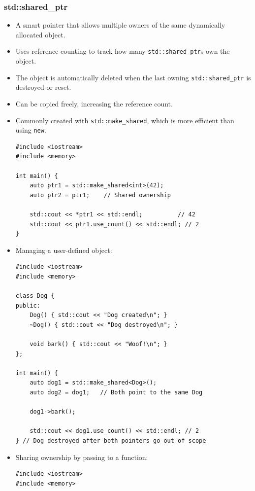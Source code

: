 \documentclass[10pt]{article}
\begin{document}
\newpage
\subsubsection{std::shared\_ptr}
\begin{itemize}
    \item A smart pointer that allows multiple owners of the same dynamically allocated object.
    \item Uses reference counting to track how many \texttt{std::shared\_ptr}s own the object.
    \item The object is automatically deleted when the last owning \texttt{std::shared\_ptr} is destroyed or reset.
    \item Can be copied freely, increasing the reference count.
    \item Commonly created with \texttt{std::make\_shared}, which is more efficient than using \texttt{new}.

    \begin{verbatim}
#include <iostream>
#include <memory>

int main() {
    auto ptr1 = std::make_shared<int>(42);
    auto ptr2 = ptr1;    // Shared ownership

    std::cout << *ptr1 << std::endl;          // 42
    std::cout << ptr1.use_count() << std::endl; // 2
}
    \end{verbatim}

    \item Managing a user-defined object:

    \begin{verbatim}
#include <iostream>
#include <memory>

class Dog {
public:
    Dog() { std::cout << "Dog created\n"; }
    ~Dog() { std::cout << "Dog destroyed\n"; }

    void bark() { std::cout << "Woof!\n"; }
};

int main() {
    auto dog1 = std::make_shared<Dog>();
    auto dog2 = dog1;   // Both point to the same Dog

    dog1->bark();

    std::cout << dog1.use_count() << std::endl; // 2
} // Dog destroyed after both pointers go out of scope
    \end{verbatim}

    \item Sharing ownership by passing to a function:

\begin{verbatim}
#include <iostream>
#include <memory>


\end{verbatim}
\end{itemize}
\end{document}
